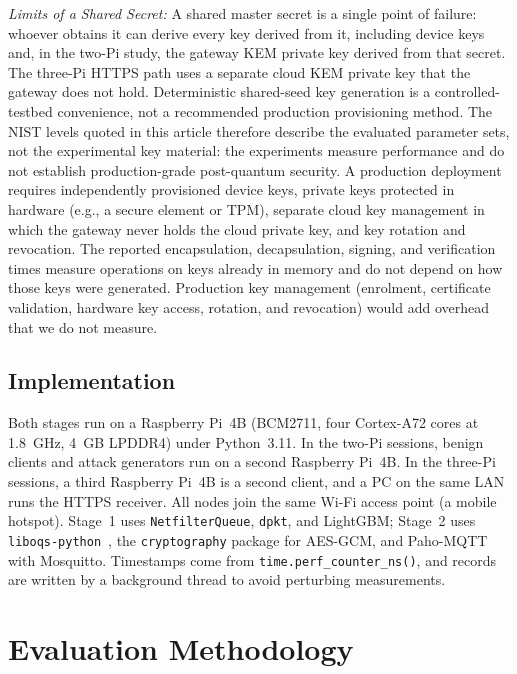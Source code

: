 \documentclass[journal]{IEEEtran}
\begin{document}
\textit{Limits of a Shared Secret:} A shared master secret is a single point of failure: whoever obtains it can derive every key derived from it, including device keys and, in the two-Pi study, the gateway KEM private key derived from that secret. The three-Pi HTTPS path uses a separate cloud KEM private key that the gateway does not hold. Deterministic shared-seed key generation is a controlled-testbed convenience, not a recommended production provisioning method. The NIST levels quoted in this article therefore describe the evaluated parameter sets, not the experimental key material: the experiments measure performance and do not establish production-grade post-quantum security. A production deployment requires independently provisioned device keys, private keys protected in hardware (e.g., a secure element or TPM), separate cloud key management in which the gateway never holds the cloud private key, and key rotation and revocation. The reported encapsulation, decapsulation, signing, and verification times measure operations on keys already in memory and do not depend on how those keys were generated. Production key management (enrolment, certificate validation, hardware key access, rotation, and revocation) would add overhead that we do not measure.

\subsection{Implementation}

Both stages run on a Raspberry Pi~4B (BCM2711, four Cortex-A72 cores at 1.8~GHz, 4~GB LPDDR4) under Python~3.11. In the two-Pi sessions, benign clients and attack generators run on a second Raspberry Pi~4B. In the three-Pi sessions, a third Raspberry Pi~4B is a second client, and a PC on the same LAN runs the HTTPS receiver. All nodes join the same Wi-Fi access point (a mobile hotspot). Stage~1 uses \texttt{NetfilterQueue}, \texttt{dpkt}, and LightGBM; Stage~2 uses \texttt{liboqs-python}~\cite{oqs2023}, the \texttt{cryptography} package for AES-GCM, and Paho-MQTT with Mosquitto. Timestamps come from \texttt{time.perf\_counter\_ns()}, and records are written by a background thread to avoid perturbing measurements.

\section{Evaluation Methodology}
\label{sec:method}
\end{document}
